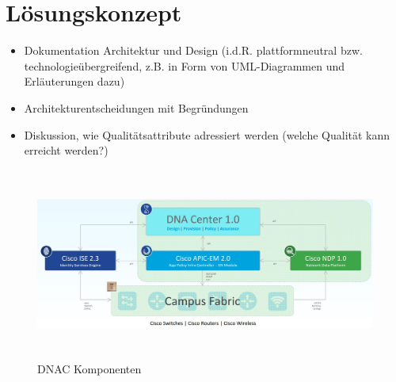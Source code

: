 \section{Lösungskonzept}

\begin{itemize}	
	\item Dokumentation Architektur und Design (i.d.R. plattformneutral bzw. technologieübergreifend, z.B. in Form von UML-Diagrammen und Erläuterungen dazu) 
	\item Architekturentscheidungen mit Begründungen
	\item Diskussion, wie Qualitätsattribute adressiert werden (welche Qualität kann erreicht werden?)
\end{itemize}


\begin{figure}[H]
	\centering
	\includegraphics[height=6.3cm]{img/DNAC-Components.jpg}
	\caption{DNAC Komponenten}
	\label{fig:DNAC Komponenten}
\end{figure}
